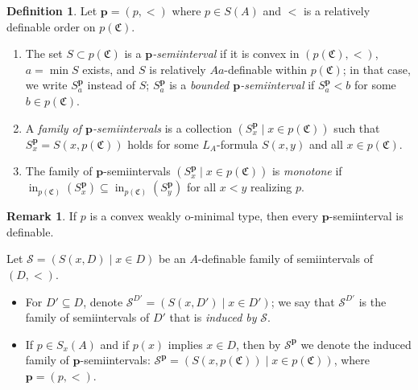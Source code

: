 \documentclass{amsart}
\theoremstyle{definition}
\theoremstyle{definition}
\newtheorem{Definition}[Theorem]{Definition}
\newtheorem{Remark}[Theorem]{Remark}
\newcommand{\Mon}{\mathfrak C}
\DeclareMathOperator{\supin}{in}
\begin{document}
\begin{Definition}\label{Definition_P_semiinterval} 
Let $\mathbf p=(p,<)$ where $p\in S(A)$ and $<$ is a relatively definable order on $p(\Mon)$.
\begin{enumerate}[\hspace{10pt} (a)]
\item The set $S\subset p(\Mon)$ is a {\em $\mathbf p$-semiinterval} if it is convex in $(p(\Mon),<)$, $a=\min S$ exists, and $S$ is relatively $Aa$-definable within $p(\Mon)$; in that case, we write $S^{\mathbf p}_a$ instead of $S$; $S^{\mathbf p}_a$ is a {\em bounded $\mathbf p$-semiinterval} if $S^{\mathbf p}_a<b$ for some $b\in p(\Mon)$.
\item A {\em family of $\mathbf p$-semiintervals} is a collection $(S^{\mathbf p}_x\mid x\in p(\Mon))$ such that $S^{\mathbf p}_x=S(x,p(\Mon))$ holds for some $L_A$-formula $S(x,y)$ and all $x\in p(\Mon)$. 
\item The family of $\mathbf p$-semiintervals $(S^{\mathbf p}_x\mid x\in p(\Mon))$ is {\em monotone} if $\supin_{p(\Mon)} (S^{\mathbf p}_x)\subseteq \supin_{p(\Mon)} (S^{\mathbf p}_y)$ for all $x<y$ realizing $p$. 
\end{enumerate}
\end{Definition}

\begin{Remark}
If $p$ is a convex weakly o-minimal type, then every $\mathbf p$-semiinterval is definable.     
\end{Remark}




Let $\mathcal S=(S(x,D)\mid x\in D)$ be an $A$-definable family of semiintervals of $(D,<)$. 
\begin{itemize}
    \item For $D'\subseteq D$, denote $\mathcal S^{D'}=(S(x,D')\mid x\in D')$; we say that $\mathcal S^{D'}$ is the family of semiintervals of $D'$ that is {\em induced by} $\mathcal S$.
    \item If $p\in S_x(A)$ and if $p(x)$ implies $x\in D$, then by $\mathcal S^{\mathbf p}$ we denote the induced family of $\mathbf p$-semiintervals: $\mathcal S^{\mathbf p}=(S(x,p(\Mon))\mid x\in p(\Mon))$, where $\mathbf p=(p,<)$.
\end{itemize}

 
\end{document}
